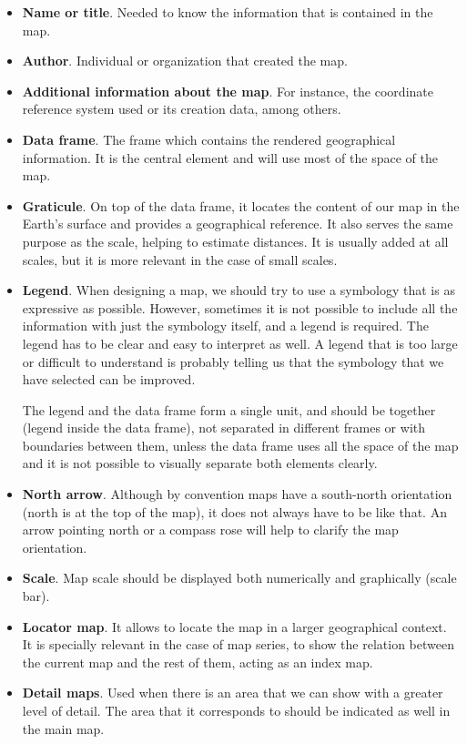 \begin{itemize}
\item \textbf{Name or title}. Needed to know the information that is contained in the map.
	\item \textbf{Author}. Individual or organization that created the map.
	\item \textbf{Additional information about the map}. For instance, the coordinate reference system used or its creation data, among others.
	\item \textbf{Data frame}. The frame which contains the rendered geographical information. It is the central element and will use most of the space of the map. 
	\item \textbf{Graticule}. On top of the data frame, it locates the content of our map in the Earth's surface and provides a geographical reference. It also serves the same purpose as the scale, helping to estimate distances. It is usually added at all scales, but it is more relevant in the case of small scales.
	\item \textbf{Legend}. When designing a map, we should try to use a symbology that is as expressive as possible. However, sometimes it is not possible to include all the information with just the symbology itself, and a legend is required. The legend has to be clear and easy to interpret as well. A legend that is too large or difficult to understand is probably telling us that the symbology that we have selected can be improved.
	
	The legend and the data frame form a single unit, and should be together (legend inside the data frame), not separated in different frames or with boundaries between them, unless the data frame uses all the space of the map and it is not possible to visually separate both elements clearly.
	

	\item \textbf{North arrow}. Although by convention maps have a south-north orientation (north is at the top of the map), it does not always have to be like that. An arrow pointing north or a compass rose will help to clarify the map orientation.
	\item \textbf{Scale}. Map scale should be displayed both numerically and graphically (scale bar).
	\item \textbf{Locator map}. It allows to locate the map in a larger geographical context. It is specially relevant in the case of map series, to show the relation between the current map and the rest of them, acting as an index map.
	\item \textbf{Detail maps}. Used when there is an area that we can show with a greater level of detail. The area that it corresponds to should be indicated as well in the main map. 
\end{itemize}

